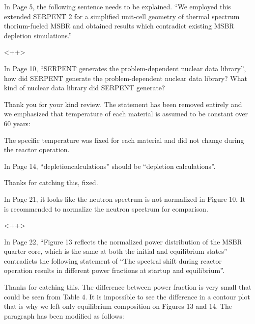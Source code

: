\documentclass[answers,11pt]{exam}
\begin{document}
\begin{questions}
        \question  In Page 5, the following sentence needs to be explained. ``We 
        employed this extended SERPENT 2 for a simplified unit-cell geometry of 
        thermal spectrum thorium-fueled MSBR and obtained results which 
        contradict existing MSBR depletion simulations.''
        \begin{solution}
                <++>
        \end{solution}

        \question  In Page 10, ``SERPENT generates the problem-dependent nuclear 
        data library'', how did SERPENT generate the problem-dependent nuclear 
        data library? What kind of nuclear data library did SERPENT generate?
        \begin{solution}
                Thank you for your kind review. The statement has been removed
		        entirely and we emphasized that temperature of each material is 
		        assumed to be constant over 60 years:
		        
		        The specific temperature was fixed for each material and did 
		        not change during the reactor operation. 
        \end{solution}

        \question  In Page 14, ``depletioncalculations'' should be ``depletion 
        calculations''.
        \begin{solution}
                Thanks for catching this, fixed.
        \end{solution}

        \question  In Page 21, it looks like the neutron spectrum is not 
        normalized in Figure 10. It is recommended to normalize the neutron 
        spectrum for comparison.
        \begin{solution}
                <++>
        \end{solution}

        \question  In Page 22, ``Figure 13 reflects the normalized power 
        distribution of the MSBR quarter core, which is the same at both the 
        initial and equilibrium states'' contradicts the following statement of 
        ``The spectral shift during reactor operation results in different power 
        fractions at startup and equilibrium''.
        \begin{solution}
                Thanks for catching this. The difference between power fraction
                 is very small that could be seen from Table 4. It is impossible
                  to see the difference in a contour plot that is why we left only 
                 equilibrium composition on Figures 13 and 14. The paragraph has 
                 been modified as follows:
                 

\end{solution}
\end{questions}
\end{document}
